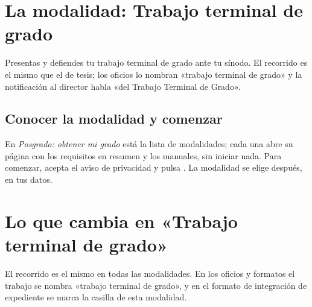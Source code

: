 \section{La modalidad: Trabajo terminal de grado}
Presentas y defiendes tu trabajo terminal de grado ante tu sínodo. El recorrido es el mismo que el de tesis; los oficios lo nombran «trabajo terminal de grado» y la notificación al director habla «del Trabajo Terminal de Grado».

\subsection{Conocer la modalidad y comenzar}
En \emph{Posgrado: obtener mi grado} está la lista de modalidades; cada una abre su página con los requisitos en resumen y los manuales, sin iniciar nada. Para comenzar, acepta el aviso de privacidad y pulsa . La modalidad se elige después, en tus datos.
\section{Lo que cambia en «Trabajo terminal de grado»}
El recorrido es el mismo en todas las modalidades. En los oficios y formatos el trabajo se nombra «trabajo terminal de grado», y en el formato de integración de expediente se marca la casilla de esta modalidad.
